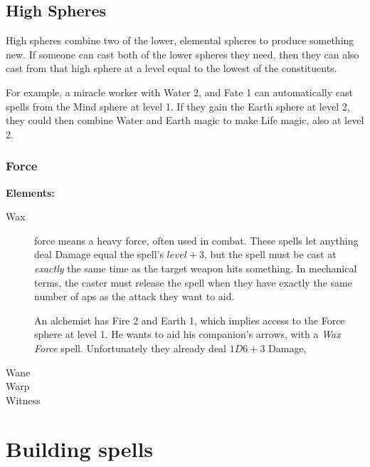 \begin{multicols}{2}
\subsection{High Spheres}

High spheres combine two of the lower, elemental spheres to produce something new.
If someone can cast both of the lower spheres they need, then they can also cast from that high sphere at a level equal to the lowest of the constituents.

\begin{exampletext}
  For example, a miracle worker with Water 2, and Fate 1 can automatically cast spells from the Mind sphere at level 1.
  If they gain the Earth sphere at level 2, they could then combine Water and Earth magic to make Life magic, also at level 2.
\end{exampletext}

\subsubsection{Force}


\textbf{Elements:}

\begin{description}
  \item[Wax]
  force means a heavy force, often used in combat.
  These spells let anything deal Damage equal the spell's $level + 3$, but the spell must be cast at \emph{exactly} the same time as the target weapon hits something.
  In mechanical terms, the caster must release the spell when they have exactly the same number of \glspl{ap} as the attack they want to aid.

  \begin{exampletext}
    An alchemist has Fire 2 and Earth 1, which implies access to the Force sphere at level 1.
    He wants to aid his companion's arrows, with a \textit{Wax Force} spell.
    Unfortunately they already deal $1D6+3$ Damage, 
  \end{exampletext}
  \item[Wane]
  \item[Warp]
  \item[Witness]
\end{description}
\end{multicols}

\section{Building spells}

